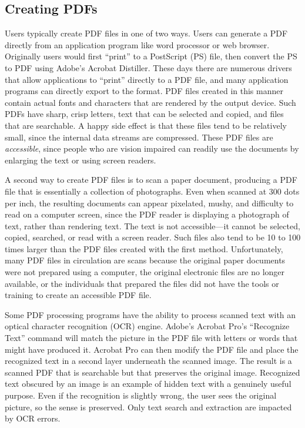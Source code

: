 \subsection{Creating PDFs}

Users typically create PDF files in one of two ways. Users can
generate a PDF directly from an application program like word
processor or web browser.  Originally users would first ``print'' to a
PostScript (PS) file, then convert the PS to PDF using Adobe's
Acrobat Distiller. These days there are numerous drivers that allow
applications to ``print'' directly to a PDF file, and many application
programs can directly export to the format. PDF files created in this
manner contain actual fonts and characters that are rendered by the
output device. Such PDFs have sharp, crisp letters, text that can be
selected and copied, and files that are searchable. A happy side
effect is that these files tend to be relatively small, since the
internal data streams are compressed. These PDF files are 
\emph{accessible}, since people who are vision impaired can readily use
the documents by enlarging the text or using screen readers.

A second way to create PDF files is to scan a paper
document, producing a PDF file that is essentially a collection of
photographs. Even when scanned at 300 dots per inch, the
resulting documents can appear pixelated, mushy, and difficulty to read on a
computer screen, since the PDF reader is displaying a photograph of text,
rather than rendering text. The
text is not accessible---it cannot be selected, copied, searched, or
read with a screen reader. Such files also tend to be 10 to 100 times
larger than the PDF files created with the first
method. Unfortunately, many PDF files in circulation are scans because
the original paper documents were not prepared using a computer,
the original electronic files are no longer  available, or the
individuals that prepared the files did not have the tools or 
training to create an accessible PDF file.

Some PDF processing programs have the ability to process scanned text
with an optical character recognition (OCR) engine. Adobe's Acrobat
Pro's ``Recognize Text'' command will match  the picture in
the PDF file with letters or words that might have produced
it. Acrobat Pro can then modify the PDF file and place the recognized
text in a second layer underneath the scanned image. The result is a
scanned PDF  that is searchable but that preserves the
original image. Recognized text obscured by an image is an example of hidden text with
a genuinely useful purpose. Even if the recognition is slightly wrong, the
user sees the original picture, so the sense is preserved. Only text
search and extraction are impacted by OCR errors.


